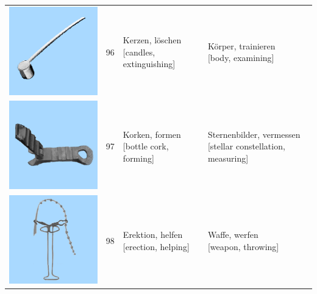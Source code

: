 \documentclass[
  english,
  doc,12pt,twoside,floatsintext]{apa7}
\begin{document}
\begin{center}
\begin{ThreePartTable}
{\begin{longtable}{llll}
\includegraphics[valign=c, scale=0.23]{../materials/unfamiliar/96.png} & 96 & \makecell[l]{Kerzen, löschen\\{[candles, extinguishing]}} & \makecell[l]{Körper, trainieren\\{[body, examining]}}\\
\includegraphics[valign=c, scale=0.23]{../materials/unfamiliar/97.png} & 97 & \makecell[l]{Korken, formen\\{[bottle cork, forming]}} & \makecell[l]{Sternenbilder, vermessen\\{[stellar constellation, measuring]}}\\
\includegraphics[valign=c, scale=0.23]{../materials/unfamiliar/98.png} & 98 & \makecell[l]{Erektion, helfen\\{[erection, helping]}} & \makecell[l]{Waffe, werfen\\{[weapon, throwing]}}\\

\end{longtable}}
\end{ThreePartTable}
\end{center}
\end{document}
